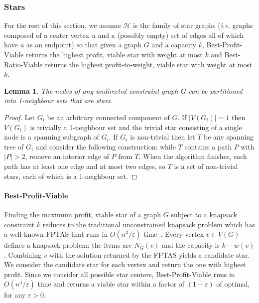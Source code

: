 \documentclass[12pt]{article}
\newtheorem{lemma}[theorem]{Lemma}
\begin{document}
\subsubsection{Stars} \label{sec:stars}

For the rest of this section, we assume $\mathcal{H}$ is the family of
star graphs ({\em i.e.} graphs composed of a center vertex $u$ and a (possibly empty) set of edges all of which have $u$ as an endpoint) so that
given a graph $G$ and a capacity $k$, {\sc Best-Profit-Viable} returns
the highest profit, viable star with weight at most $k$ and {\sc Best-Ratio-Viable} returns the highest profit-to-weight, viable star with weight at most $k$.

\begin{lemma}\label{lem:graphs-into-stars}
The nodes of any undirected constraint graph $G$ can be partitioned into 1-neighbour sets that are stars.
\end{lemma}

\begin{proof}
Let $G_{i}$ be an arbitrary connected component of $G$.  If $|V(G_{i})|=1$ then $V(G_{i})$ is trivially a 1-neighbour set and the trivial star consisting of a single node is a spanning subgraph of $G_{i}$.  If $G_{i}$ is non-trivial then let $T$ be any spanning tree of $G_{i}$ and consider the following construction: while $T$ contains a path $P$ with $|P| > 2$, remove an interior edge of $P$ from $T$.  When the algorithm finishes, each path has at least one edge and at most two edges, so $T$ is a set of non-trivial stars, each of which is a 1-neighbour set.
\hfill  \end{proof}

\paragraph{{\sc Best-Profit-Viable}}

Finding the maximum profit, viable star of a graph $G$ subject to a knapsack constraint $k$ reduces to the traditional unconstrained knapsack problem which has a well-known FPTAS that runs in $O(n^{3} / \varepsilon)$ time~\cite{ibarra-kim:jacm1975,vazirani}. Every vertex $v \in V(G)$ defines a knapsack problem:  the items are $N_{G}(v)$ and the capacity is $k-w(v)$.  Combining $v$ with the solution returned by the  FPTAS  yields a candidate star.  We consider the candidate star for each vertex and return the one with highest profit.  Since we consider all possible star centers, {\sc Best-Profit-Viable} runs in $O(n^{4} / \varepsilon)$ time and returns a viable star within a factor of $(1-\varepsilon)$ of optimal, for any $\varepsilon > 0$.
\end{document}
